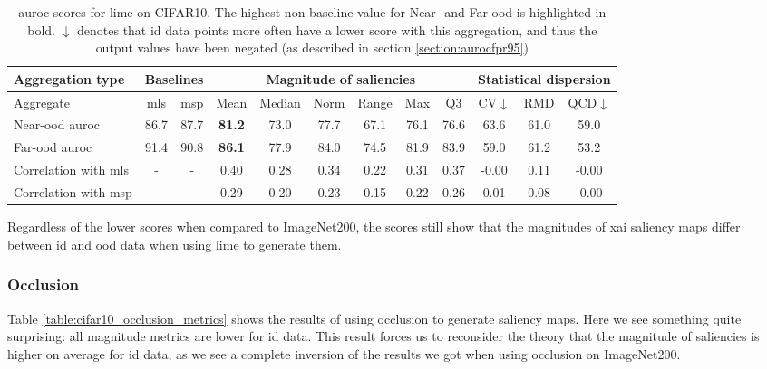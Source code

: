 \documentclass[UKenglish]{uiomasterthesis} %
\theoremstyle{definition}
\begin{document}
\begin{table}[H]
\setlength\tabcolsep{3pt}
\begin{center}
\begin{tabular}{ |p{5.1em}|c c|c c c c c c|c c c| }
    \hline
     \centering Aggregation type & \multicolumn{2}{c|}{Baselines} & \multicolumn{6}{c|}{Magnitude of saliencies} & \multicolumn{3}{p{8em}|}{\centering Statistical dispersion} \\
    \hline
    Aggregate & \ac{mls} & \ac{msp} & Mean & Median & Norm & Range & Max & Q3 & CV$\downarrow$ & RMD & QCD$\downarrow$  \\
    \hline
    \rowcolor{near!50}
    Near-\ac{ood} \ac{auroc} & 86.7 & 87.7 &\textbf{ 81.2 }& 73.0 & 77.7 & 67.1 & 76.1 & 76.6 & 63.6 & 61.0 & 59.0  \\
    \hline
    \rowcolor{far!50}
    Far-\ac{ood} \ac{auroc} & 91.4 & 90.8 &\textbf{ 86.1 }& 77.9 & 84.0 & 74.5 & 81.9 & 83.9 & 59.0 & 61.2 & 53.2  \\
    \hline
    Correlation with \ac{mls}& - & - & 0.40 & 0.28 & 0.34 & 0.22 & 0.31 & 0.37 & -0.00 & 0.11 & -0.00  \\
    \hline
    Correlation with \ac{msp}& - & - & 0.29 & 0.20 & 0.23 & 0.15 & 0.22 & 0.26 & 0.01 & 0.08 & -0.00  \\
    \hline
    \end{tabular}
    \caption[\ac{auroc} scores for \ac{lime} on CIFAR10]{\ac{auroc} scores for \ac{lime} on CIFAR10. The highest non-baseline value for Near- and Far-\ac{ood} is highlighted in bold. $\downarrow$ denotes that \ac{id} data points more often have a lower score with this aggregation, and thus the output values have been negated (as described in section \ref{section:aurocfpr95})}
    \label{table:cifar10_lime_metrics}
\end{center}

\setlength\tabcolsep{6pt}
\end{table}

Regardless of the lower scores when compared to ImageNet200, the scores still show that the magnitudes of \ac{xai} saliency maps differ between \ac{id} and \ac{ood} data when using \ac{lime} to generate them.

\subsubsection{Occlusion}

Table \ref{table:cifar10_occlusion_metrics} shows the results of using occlusion to generate saliency maps. Here we see something quite surprising: all magnitude metrics are lower for \ac{id} data. This result forces us to reconsider the theory that the magnitude of saliencies is higher on average for \ac{id} data, as we see a complete inversion of the results we got when using occlusion on ImageNet200. %
\end{document}
